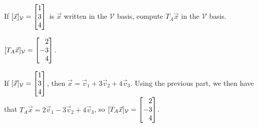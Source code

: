	\begin{parts}[resume]
	\item If $[\vec x]_{\mathcal V}=\mat{1\\3\\4}$ is $\vec x$ written in the $\mathcal V$ basis,
		compute $T_A\vec x$ in the $\mathcal V$ basis.
		\begin{solution}
			$[T_A\vec x]_{\mathcal V}=\mat{2\\-3\\4}$.

			If $[\vec x]_{\mathcal V}=\mat{1\\3\\4}$, then
			$\vec x=\vec v_1+3\vec v_2+4\vec v_3$. Using the previous part, we
			then have that $T_A\vec x=2\vec v_1-3\vec v_2+4\vec v_3$, so
			$[T_A\vec x]_{\mathcal V}=\mat{2\\-3\\4}$.
		\end{solution}
	\end{parts}


